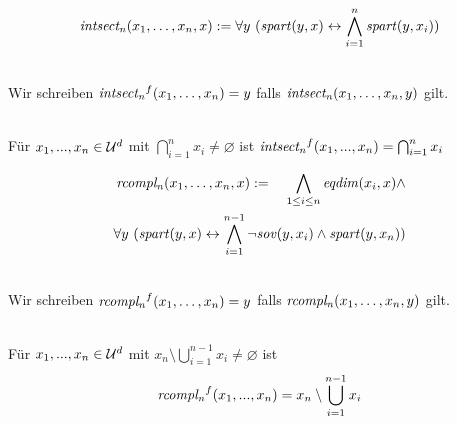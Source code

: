 \begin{erin}
    \begin{align*}
        \mathit{intsect_{n}}(x_{1},\ldots,x_{n},x)  := \forall y\ (\mathit{spart}(y,x) \leftrightarrow \bigwedge^{n}_{i=1} \mathit{spart}(y,x_{i}))
    \end{align*}
\end{erin}

\begin{erin}\ \\
    Wir schreiben $\mathit{intsect_{n}}^f(x_{1},\ldots,x_{n}) = y$ falls $\mathit{intsect_{n}}(x_{1},\ldots,x_{n},y)$ gilt.
\end{erin}

\begin{hyp}\ \\
    Für $x_1, ..., x_n \in \mathcal{U}^d$ mit $\bigcap_{i=1}^n x_i \neq \varnothing$ ist $\mathit{intsect_{n}}^f(x_1, ..., x_n) = \bigcap_{i=1}^n x_i$
\end{hyp}


\begin{erin}
    \begin{align*}
        \mathit{rcompl_{n}}(x_{1},\ldots,x_{n},x) := \hspace*{1em}\bigwedge_{1\leq i \leq n} \mathit{eqdim}(x_i, x) \wedge\\
        \forall y\ (\mathit{spart}(y,x)
        \leftrightarrow \bigwedge^{n-1}_{i=1} \neg\mathit{sov}(y,x_{i}) \wedge \mathit{spart}(y, x_{n}))
    \end{align*}
\end{erin}

\begin{erin}\ \\
    Wir schreiben $\mathit{rcompl_{n}}^f(x_{1},\ldots,x_{n}) = y$ falls $\mathit{rcompl_{n}}(x_{1},\ldots,x_{n},y)$ gilt.
\end{erin}

\begin{hyp}\ \\
    Für $x_1, ..., x_n \in \mathcal{U}^d$ mit $x_n \setminus \bigcup_{i=1}^{n-1} x_i \neq \varnothing$ ist 
    \begin{align*}
        \mathit{rcompl_{n}}^f(x_1, ..., x_n) = x_n \setminus \bigcup_{i=1}^{n-1} x_i
    \end{align*}
\end{hyp}



